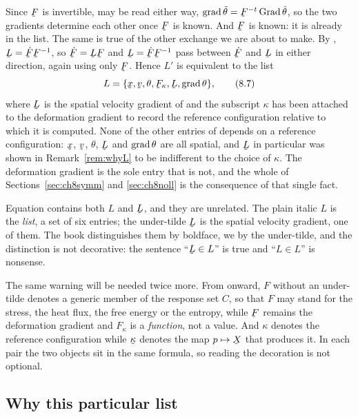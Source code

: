 Since $\bF$ is invertible,  may be read either way,
$\grad\tilde\theta=\bF^{-t}\Grad\hat\theta$, so the two gradients
determine each other once $\bF$ is known. And $\bF$ is known: it is
already in the list. The same is true of the other exchange we are about
to make. By , $\bL=\dot\bF\bF^{-1}$, so $\dot\bF=\bL\bF$ and
$\bL=\dot\bF\bF^{-1}$ pass between $\dot\bF$ and $\bL$ in either
direction, again using only $\bF$. Hence $L'$ is equivalent to the list
\begin{equation}
   L=\{\bx,\bv,\theta,\bF_{\kappa},\bL,\grad\theta\},
   \tag{8.7}\label{eq:8.7}
\end{equation}
where $\bL$ is the spatial velocity gradient of  and the
subscript $\kappa$ has been attached to the deformation gradient to
record the reference configuration relative to which it is computed.
None of the other entries of  depends on a reference
configuration: $\bx$, $\bv$, $\theta$, $\bL$ and $\operatorname{grad}\theta$ are all
spatial, and $\bL$ in particular was shown in Remark~\ref{rem:whyL} to
be indifferent to the choice of $\kappa$. The deformation gradient is
the sole entry that is not, and the whole of
Sections~\ref{sec:ch8symm} and \ref{sec:ch8noll} is the consequence of
that single fact.

\begin{remark}\label{rem:ch8letters}
Equation  contains both $L$ and $\bL$, and they are unrelated.
The plain italic $L$ is the \emph{list}, a set of six entries; the
under-tilde $\bL$ is the spatial velocity gradient, one of them. The
book distinguishes them by boldface, we by the under-tilde, and the
distinction is not decorative: the sentence ``$\bL\in L$'' is true and
``$L\in L$'' is nonsense.

The same warning will be needed twice more. From  onward,
$F$ without an under-tilde denotes a generic member of the response set
$C$, so that $F$ may stand for the stress, the heat flux, the free
energy or the entropy, while $\bF$ remains the deformation gradient and
$F_{\kappa}$ is a \emph{function}, not a value. And $\kappa$ denotes the
reference configuration while $\bkappa$ denotes the map $p\mapsto\bX$
that produces it. In each pair the two objects sit in the same formula,
so reading the decoration is not optional.
\end{remark}

\subsection*{Why this particular list}

